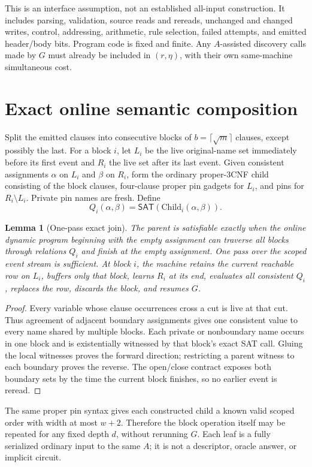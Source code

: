 \documentclass[11pt]{article}
\newtheorem{lemma}[theorem]{Lemma}
\newcommand{\SAT}{\mathsf{SAT}}
\begin{document}
This is an interface assumption, not an established all-input construction.
It includes parsing, validation, source reads and rereads, unchanged and
changed writes, control, addressing, arithmetic, rule selection, failed
attempts, and emitted header/body bits.  Program code is fixed and finite.
Any \(A\)-assisted discovery calls made by \(G\) must already be included in
\((r,\eta)\), with their own same-machine simultaneous cost.

\section{Exact online semantic composition}
Split the emitted clauses into consecutive blocks of
\(b=\lceil\sqrt m\rceil\) clauses, except possibly the last.  For a block
\(i\), let \(L_i\) be the live original-name set immediately before its first
event and \(R_i\) the live set after its last event.  Given consistent
assignments \(\alpha\) on \(L_i\) and \(\beta\) on \(R_i\), form the ordinary
proper-3CNF child consisting of the block clauses, four-clause proper
pin gadgets for \(L_i\), and pins for \(R_i\setminus L_i\).  Private pin
names are fresh.  Define
\[
Q_i(\alpha,\beta)=\SAT(\mathrm{Child}_i(\alpha,\beta)).
\]

\begin{lemma}[One-pass exact join]
The parent is satisfiable exactly when the online dynamic program beginning
with the empty assignment can traverse all blocks through relations \(Q_i\)
and finish at the empty assignment.  One pass over the scoped event stream
is sufficient.  At block \(i\), the machine retains the current reachable
row on \(L_i\), buffers only that block, learns \(R_i\) at its end, evaluates
all consistent \(Q_i\), replaces the row, discards the block, and resumes
\(G\).
\end{lemma}
\begin{proof}
Every variable whose clause occurrences cross a cut is live at that cut.
Thus agreement of adjacent boundary assignments gives one consistent value
to every name shared by multiple blocks.  Each private or nonboundary name
occurs in one block and is existentially witnessed by that block's exact SAT
call.  Gluing the local witnesses proves the forward direction; restricting
a parent witness to each boundary proves the reverse.  The open/close
contract exposes both boundary sets by the time the current block finishes,
so no earlier event is reread.
\end{proof}

The same proper pin syntax gives each constructed child a known valid scoped
order with width at most \(w+2\).  Therefore the block operation itself may
be repeated for any fixed depth \(d\), without rerunning \(G\).  Each leaf is
a fully serialized ordinary input to the same \(A\); it is not a descriptor,
oracle answer, or implicit circuit.
\end{document}
